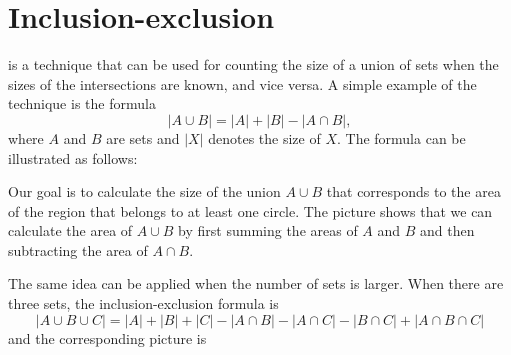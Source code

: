 \section{Inclusion-exclusion}


 is a technique
that can be used for counting the size
of a union of sets when the sizes of
the intersections are known, and vice versa.
A simple example of the technique is the formula
\[ |A \cup B| = |A| + |B| - |A \cap B|,\]
where $A$ and $B$ are sets and $|X|$
denotes the size of $X$.
The formula can be illustrated as follows:

\begin{center}
\end{center}

Our goal is to calculate
the size of the union $A \cup B$
that corresponds to the area of the region
that belongs to at least one circle.
The picture shows that we can calculate
the area of $A \cup B$ by first summing the
areas of $A$ and $B$ and then subtracting
the area of $A \cap B$.

The same idea can be applied when the number
of sets is larger.
When there are three sets, the inclusion-exclusion formula is
\[ |A \cup B \cup C| = |A| + |B| + |C| - |A \cap B|  - |A \cap C|  - |B \cap C| + |A \cap B \cap C| \]
and the corresponding picture is

\begin{center}
\end{center}

